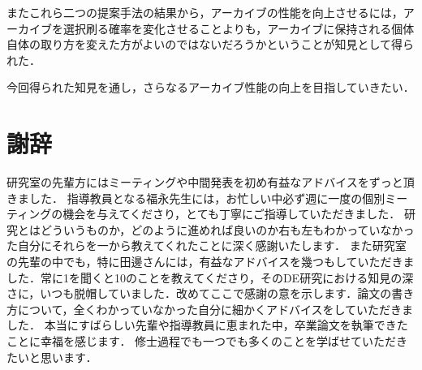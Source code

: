 \documentclass[a4paper,11pt,oneside,openany]{jsbook}
\begin{document}
またこれら二つの提案手法の結果から，アーカイブの性能を向上させるには，アーカイブを選択刷る確率を変化させることよりも，アーカイブに保持される個体自体の取り方を変えた方がよいのではないだろうかということが知見として得られた．

今回得られた知見を通し，さらなるアーカイブ性能の向上を目指していきたい．

\section{謝辞}
研究室の先輩方にはミーティングや中間発表を初め有益なアドバイスをずっと頂きました．
指導教員となる福永先生には，お忙しい中必ず週に一度の個別ミーティングの機会を与えてくださり，とても丁寧にご指導していただきました．
研究とはどういうものか，どのように進めれば良いのか右も左もわかっていなかった自分にそれらを一から教えてくれたことに深く感謝いたします．
また研究室の先輩の中でも，特に田邊さんには，有益なアドバイスを幾つもしていただきました．常に1を聞くと10のことを教えてくださり，そのDE研究における知見の深さに，いつも脱帽していました．改めてここで感謝の意を示します．論文の書き方について，全くわかっていなかった自分に細かくアドバイスをしていただきました．
本当にすばらしい先輩や指導教員に恵まれた中，卒業論文を執筆できたことに幸福を感じます．
修士過程でも一つでも多くのことを学ばせていただきたいと思います．
\end{document}
